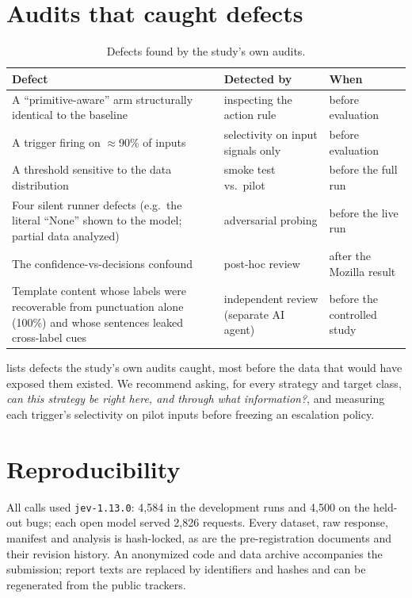\section{Audits that caught defects}
\label{app:audits}
\begin{table}[t]
\centering
\caption{Defects found by the study's own audits.}
\label{tab:audits}

\small
\begin{tabularx}{\linewidth}{Y l l}
\toprule
Defect & Detected by & When \\
\midrule
A ``primitive-aware'' arm structurally identical to the baseline & inspecting the action rule & before evaluation \\ \addlinespace
A trigger firing on $\approx$90\% of inputs & selectivity on input signals only & before evaluation \\ \addlinespace
A threshold sensitive to the data distribution & smoke test vs.\ pilot & before the full run \\ \addlinespace
Four silent runner defects (e.g.\ the literal ``None'' shown to the model; partial data analyzed) & adversarial probing & before the live run \\ \addlinespace
The confidence-vs-decisions confound & post-hoc review & after the Mozilla result \\ \addlinespace
Template content whose labels were recoverable from punctuation alone (100\%) and whose sentences leaked cross-label cues & independent review (separate AI agent) & before the controlled study \\
\bottomrule
\end{tabularx}

\end{table}

 lists defects the study's own audits caught, most
before the data that would have exposed them existed. We recommend asking,
for every strategy and target class, \emph{can this strategy be right
here, and through what information?}, and measuring each trigger's
selectivity on pilot inputs before freezing an escalation policy.

\section{Reproducibility}
\label{app:repro}
All calls used \texttt{jev-1.13.0}: 4{,}584 in the development runs and
4{,}500 on the held-out bugs; each open model served 2{,}826 requests.
Every dataset, raw response, manifest and analysis is hash-locked, as are
the pre-registration documents and their revision history. An anonymized
code and data archive accompanies the submission; report texts are
replaced by identifiers and hashes and can be regenerated from the public
trackers.
